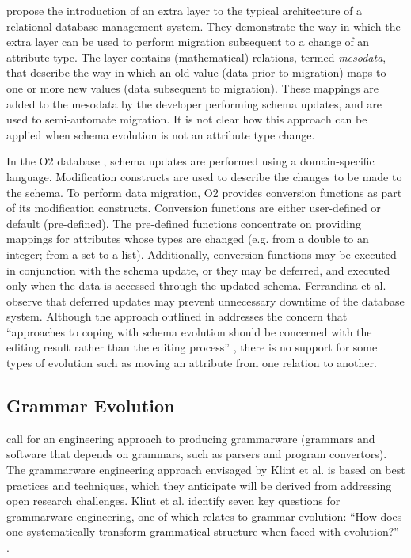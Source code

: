 \cite{vries04facilitating} propose the introduction of an extra layer to the typical architecture of a relational database management system. They demonstrate the way in which the extra layer can be used to perform migration subsequent to a change of an attribute type. The layer contains (mathematical) relations, termed \textit{mesodata}, that describe the way in which an old value (data prior to migration) maps to one or more new values (data subsequent to migration). These mappings are added to the mesodata by the developer performing schema updates, and are used to semi-automate migration. It is not clear how this approach can be applied when schema evolution is not an attribute type change.

In the O2 database \cite{ferrandina95schema}, schema updates are performed using a domain-specific language. Modification constructs are used to describe the changes to be made to the schema. To perform data migration, O2 provides conversion functions as part of its modification constructs. Conversion functions are either user-defined or default (pre-defined). The pre-defined functions concentrate on providing mappings for attributes whose types are changed (e.g. from a double to an integer; from a set to a list). Additionally, conversion functions may be executed in conjunction with the schema update, or they may be deferred, and executed only when the data is accessed through the updated schema. Ferrandina et al. observe that deferred updates may prevent unnecessary downtime of the database system. Although the approach outlined in \cite{ferrandina95schema} addresses the concern that ``approaches to coping with schema evolution should be concerned with the editing result rather than the editing process'' \cite{lerner00model}, there is no support for some types of evolution such as moving an attribute from one relation to another.


\subsection{Grammar Evolution}
\label{subsec:grammar_evolution}
\cite{klint03grammarware} call for an engineering approach to producing grammarware (grammars and software that depends on grammars, such as parsers and program convertors). The grammarware engineering approach envisaged by Klint et al. is based on best practices and techniques, which they anticipate will be derived from addressing open research challenges. Klint et al. identify seven key questions for grammarware engineering, one of which relates to grammar evolution: ``How does one systematically transform grammatical structure when faced with evolution?'' \cite[pg. 334]{klint03grammarware}.

